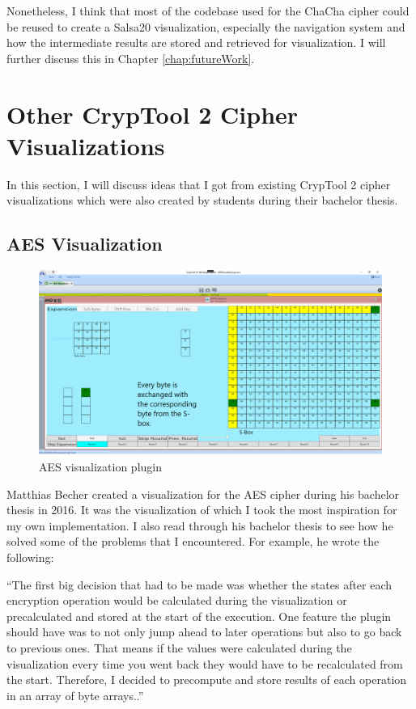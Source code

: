 Nonetheless, I think that most of the codebase used for the ChaCha cipher could be reused to create a Salsa20 visualization, especially the navigation system and how the intermediate results are stored and retrieved for visualization. I will further discuss this in Chapter \ref{chap:futureWork}.


\section{Other CrypTool 2 Cipher Visualizations}
\label{sec:otherCT2CipherVisualizations}

In this section, I will discuss ideas that I got from existing CrypTool 2 cipher visualizations which were also created by students during their bachelor thesis.

\subsection{AES Visualization}
\label{sec:aesVisualization}

\begin{figure}
\caption{AES visualization plugin}
\label{fig:aes}
\centering
\includegraphics[width=\textwidth]{figures/ct2/aes.png}
\end{figure}

Matthias Becher created a visualization for the AES cipher during his bachelor thesis in 2016. It was the visualization of which I took the most inspiration for my own implementation. I also read through his bachelor thesis to see how he solved some of the problems that I encountered. For example, he wrote the following:

``The first big decision that had to be made was whether the states after each encryption operation would be calculated during the visualization or precalculated and stored at the start of the execution. One feature the plugin should have was to not only jump ahead to later operations but also to go back to previous ones. That means if the values were calculated during the visualization every time you went back they would have to be recalculated from the start. Therefore, I decided to precompute and store results of each operation in an array of byte arrays..'' \cite{aesthesis}

